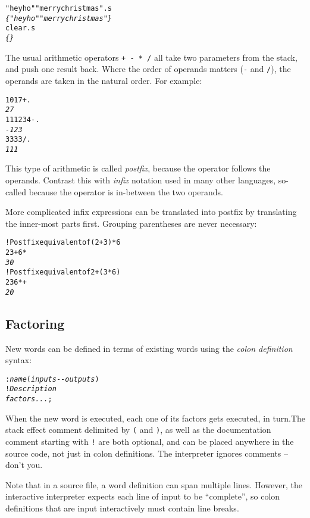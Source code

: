 \documentclass[english]{article}
\begin{document}
\begin{alltt}
"hey ho" "merry christmas" .s
\emph{\{ "hey ho" "merry christmas" \}}
clear .s
\emph{\{ \}}
\end{alltt}

The usual arithmetic operators \texttt{+ - {*} /} all take two parameters
from the stack, and push one result back. Where the order of operands
matters (\texttt{-} and \texttt{/}), the operands are taken in the natural order. For example:

\begin{alltt}
10 17 + .
\emph{27}
111 234 - .
\emph{-123}
333 3 / .
\emph{111}
\end{alltt}

This type of arithmetic is called \emph{postfix}, because the operator
follows the operands. Contrast this with \emph{infix} notation used
in many other languages, so-called because the operator is in-between
the two operands.

More complicated infix expressions can be translated into postfix
by translating the inner-most parts first. Grouping parentheses are
never necessary:

\begin{alltt}
! Postfix equivalent of (2 + 3) {*} 6
2 3 + 6 {*}
\emph{30}
! Postfix equivalent of 2 + (3 {*} 6)
2 3 6 {*} +
\emph{20}
\end{alltt}

\subsection{Factoring}

New words can be defined in terms of existing words using the \emph{colon
definition} syntax:

\begin{alltt}
: \emph{name} ( \emph{inputs} -{}- \emph{outputs} )
    ! \emph{Description}
    \emph{factors ...} ;
\end{alltt}

When the new word is executed, each one of its factors gets executed,
in turn.The stack effect comment delimited by \texttt{(} and \texttt{)},
as well as the documentation comment starting with \texttt{!} are
both optional, and can be placed anywhere in the source code, not
just in colon definitions. The interpreter ignores comments -- don't you.

Note that in a source file, a word definition can span multiple lines.
However, the interactive interpreter expects each line of input to
be ``complete'', so colon definitions that are input interactively must contain line breaks.
\end{document}
